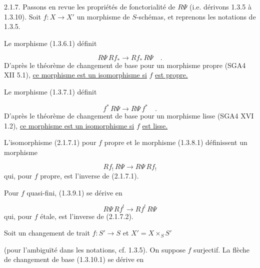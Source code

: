 2.1.7. Passons en revue les propriétés de fonctorialité de $R\Psi$ (i.e. dérivons 1.3.5 à 1.3.10). Soit $f : X \longrightarrow X'$ un morphisme de $S$-schémas, et reprenons les notations de 1.3.5.

Le morphisme (1.3.6.1) définit

\begin{equation}\tag{2.1.7.1}
R\Psi\, Rf_* \longrightarrow Rf_*\, R\Psi \quad .
\end{equation}
D'après le théorème de changement de base pour un morphisme propre (SGA4 XII 5.1), \underline{ce morphisme est un isomorphisme si} $f$ \underline{est propre.}

Le morphisme (1.3.7.1) définit

\begin{equation}\tag{2.1.7.2}
f^*\, R\Psi \longrightarrow R\Psi\, f^* \quad .
\end{equation}
D'après le théorème de changement de base pour un morphisme lisse (SGA4 XVI 1.2), \underline{ce morphisme est un isomorphisme si} $f$ \underline{est lisse.}

L'isomorphisme (2.1.7.1) pour $f$ propre et le morphisme (1.3.8.1)
définissent un morphisme

\begin{equation}\tag{2.1.7.3}
Rf_! \, R\Psi \longrightarrow R\Psi \, Rf_!
\end{equation}
qui, pour $f$ propre, est l'inverse de (2.1.7.1).

Pour $f$ quasi-fini, (1.3.9.1) se dérive en

\begin{equation}\tag{2.1.7.4}
R\Psi \, Rf^! \longrightarrow Rf^! \, R\Psi
\end{equation}
qui, pour $f$ étale, est l'inverse de (2.1.7.2).

Soit un changement de trait $f : S' \longrightarrow S$ et $X' = X \times_S S'$

\begin{center}
\end{center}
(pour l'ambiguïté dans les notations, cf. 1.3.5). On suppose $f$ surjectif. La flèche de changement de base (1.3.10.1) se dérive en

